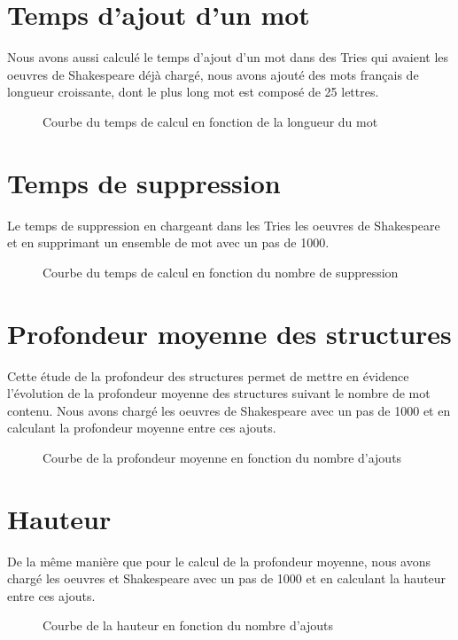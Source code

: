 \documentclass[a4paper,12pt]{report}
\begin{document}
\section{Temps d'ajout d'un mot}
Nous avons aussi calculé le temps d'ajout d'un mot dans des Tries qui avaient les oeuvres de Shakespeare déjà chargé, nous avons
ajouté des mots français de longueur croissante, dont le plus long mot est composé de 25 lettres.
\begin{figure}[!htbp]
\caption{Courbe du temps de calcul en fonction de la longueur du mot}
\end{figure}
\section{Temps de suppression}
Le temps de suppression en chargeant dans les Tries les oeuvres de Shakespeare et en supprimant un ensemble de mot avec un pas
de 1000.
\begin{figure}[!htbp]
\caption{Courbe du temps de calcul en fonction du nombre de suppression}
\end{figure}

\section{Profondeur moyenne des structures}
Cette étude de la profondeur des structures permet de mettre en évidence l'évolution de la profondeur moyenne des structures
suivant le nombre de mot contenu. Nous avons chargé les oeuvres de Shakespeare avec un pas de 1000 et en calculant la profondeur
moyenne entre ces ajouts.
\begin{figure}[!htbp]
\caption{Courbe de la profondeur moyenne en fonction du nombre d'ajouts}
\end{figure}
\section{Hauteur}
De la même manière que pour le calcul de la profondeur moyenne, nous avons chargé les oeuvres et Shakespeare avec un pas de 1000
et en calculant la hauteur entre ces ajouts.
\begin{figure}[!htbp]
\caption{Courbe de la hauteur en fonction du nombre d'ajouts}
\end{figure}
\end{document}
